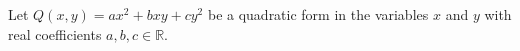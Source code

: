 Let $Q(x, y) = ax^2 + bxy + cy^2$ be a quadratic form in the variables $x$ and $y$ with real coefficients $a, b, c \in \mathbb{R}$.
